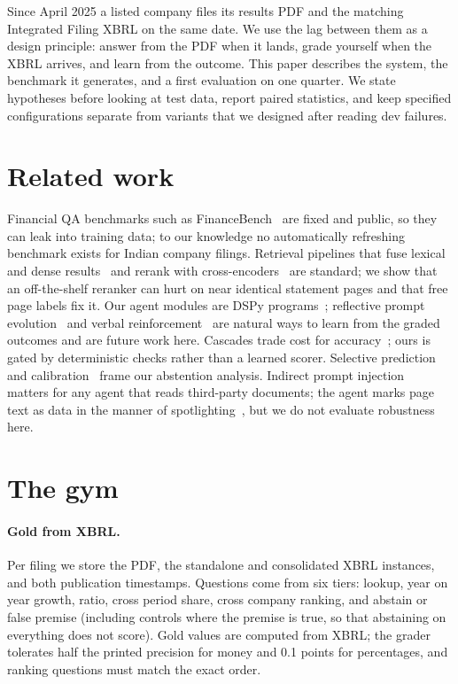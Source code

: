 \documentclass[11pt]{article}
\begin{document}
Since April 2025 a listed company files its results PDF and the matching Integrated Filing XBRL on the same date. We use the lag between them as a design principle: answer from the PDF when it lands, grade yourself when the XBRL arrives, and learn from the outcome. This paper describes the system, the benchmark it generates, and a first evaluation on one quarter. We state hypotheses before looking at test data, report paired statistics, and keep specified configurations separate from variants that we designed after reading dev failures.

\section{Related work}
Financial QA benchmarks such as FinanceBench~\citep{islam2023financebench} are fixed and public, so they can leak into training data; to our knowledge no automatically refreshing benchmark exists for Indian company filings. Retrieval pipelines that fuse lexical and dense results~\citep{cormack2009rrf} and rerank with cross-encoders~\citep{nogueira2019passage} are standard; we show that an off-the-shelf reranker can hurt on near identical statement pages and that free page labels fix it. Our agent modules are DSPy programs~\citep{khattab2023dspy}; reflective prompt evolution~\citep{agrawal2025gepa} and verbal reinforcement~\citep{shinn2023reflexion} are natural ways to learn from the graded outcomes and are future work here. Cascades trade cost for accuracy~\citep{chen2023frugalgpt}; ours is gated by deterministic checks rather than a learned scorer. Selective prediction and calibration~\citep{geifman2017selective,guo2017calibration} frame our abstention analysis. Indirect prompt injection~\citep{greshake2023indirect} matters for any agent that reads third-party documents; the agent marks page text as data in the manner of spotlighting~\citep{hines2024spotlighting}, but we do not evaluate robustness here.

\section{The gym}
\paragraph{Gold from XBRL.} Per filing we store the PDF, the standalone and consolidated XBRL instances, and both publication timestamps. Questions come from six tiers: lookup, year on year growth, ratio, cross period share, cross company ranking, and abstain or false premise (including controls where the premise is true, so that abstaining on everything does not score). Gold values are computed from XBRL; the grader tolerates half the printed precision for money and 0.1 points for percentages, and ranking questions must match the exact order.
\end{document}
